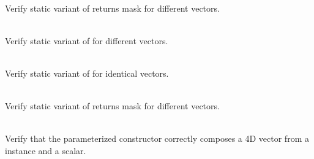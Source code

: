 \begin{DoxyRefList}
\item[{\parbox[t]{\linewidth}{Member \doxylink{group___f_g_m___vec4___equality_gaf22ed9ce751057e6be5055fb2d92ef7b}{Vector4\+DEquality\+\_\+\+Static\+Wrapper\+\_\+\+Equality\+Returns\+Correct\+Boolean\+Mask} ()}}]\hfill \\
\label{test__test000084}%
%
Verify static variant of  returns  mask for different vectors.  
\item[{\parbox[t]{\linewidth}{Member \doxylink{group___f_g_m___vec4___inequality_gaa908d51e38872e61f926b280b3d152ab}{Vector4\+DEquality\+\_\+\+Static\+Wrapper\+\_\+\+Inequality\+\_\+\+Different\+Vectors\+Returns\+True} ()}}]\hfill \\
\label{test__test000088}%
%
Verify static variant of  for different vectors.  
\item[{\parbox[t]{\linewidth}{Member \doxylink{group___f_g_m___vec4___inequality_gab4ce5a56b230bf185812eefc55fd3811}{Vector4\+DEquality\+\_\+\+Static\+Wrapper\+\_\+\+Inequality\+\_\+\+Identical\+Vectors\+Returns\+False} ()}}]\hfill \\
\label{test__test000087}%
%
Verify static variant of  for identical vectors.  
\item[{\parbox[t]{\linewidth}{Member \doxylink{group___f_g_m___vec4___inequality_gaa43894fd37190b737b5b5e563d60e6b4}{Vector4\+DEquality\+\_\+\+Static\+Wrapper\+\_\+\+Inequality\+Returns\+Correct\+Boolean\+Mask} ()}}]\hfill \\
\label{test__test000102}%
%
Verify static variant of  returns  mask for different vectors.  
\item[{\parbox[t]{\linewidth}{Member \doxylink{group___f_g_m___vec4___init_gaf8befa6ae18bcf39392f885612b903c0}{Vector4\+DInitialization\+\_\+3\+DVector\+And\+Scalar\+Can\+Initialize\+A4\+DVector} ()}}]\hfill \\
\label{test__test000106}%
%
Verify that the  parameterized constructor correctly composes a 4D vector from a  instance and a scalar.  

\end{DoxyRefList}
